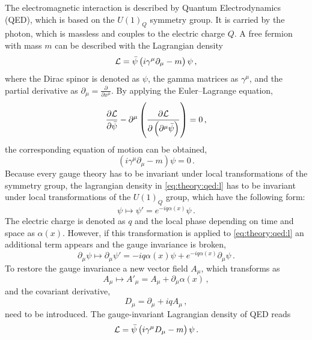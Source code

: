 The electromagnetic interaction is described by Quantum Electrodynamics (QED), which is based on the $U(1)_Q$ symmetry group.
It is carried by the photon, which is massless and couples to the electric charge $Q$.
A free fermion with mass $m$ can be described with the Lagrangian density
\begin{equation}
    \label{eq:theory:qed:l}
    \mathcal{L} = \bar{\psi} \left( i \gamma^\mu \partial_\mu - m\right) \psi \,,
\end{equation}
where the Dirac spinor is denoted as $\psi$, the gamma matrices as $\gamma^\mu$, and the partial derivative as $\partial_\mu = \frac{\partial}{\partial x^\mu}$.
By applying the Euler--Lagrange equation,
\begin{equation}
    \frac{\partial \mathcal{L}}{\partial \bar{\psi}} - \partial^\mu \left( \frac{\partial \mathcal{L}}{\partial \left(\partial^\mu \bar{\psi} \right)} \right) = 0 \,,
\end{equation}
the corresponding equation of motion can be obtained,
\begin{equation}
     \left( i \gamma^\mu \partial_\mu - m\right) \psi = 0\,.
\end{equation}
Because every gauge theory has to be invariant under local transformations of the symmetry group, the lagrangian density in \cref{eq:theory:qed:l} has to be
invariant under local transformations of the $U(1)_Q$ group, which have the following form:
\begin{equation}
    \psi \mapsto \psi' = e^{-iq\alpha(x)} \psi \,.
\end{equation}
The electric charge is denoted as $q$ and the local phase depending on time and space as $\alpha(x)$.
However, if this transformation is applied to \cref{eq:theory:qed:l} an additional term appears and the
gauge invariance is broken,
\begin{equation}
    \partial_\mu \psi \mapsto \partial_\mu \psi' = -i q \alpha(x) \psi + e^{-iq\alpha(x)} \partial_\mu \psi \,.
\end{equation}
To restore the gauge invariance a new vector field $A_\mu$, which transforms as
\begin{equation}
    A_\mu \mapsto A'_\mu = A_\mu + \partial_\mu \alpha(x) \,,
\end{equation}
and the covariant derivative,
\begin{equation}
    D_\mu = \partial_\mu + i q A_\mu \,,
\end{equation}
need to be introduced.
The gauge-invariant Lagrangian density of QED reads
\begin{equation}
    \mathcal{L} = \bar{\psi} \left( i \gamma^\mu D_\mu -m \right) \psi \,.
\end{equation}
